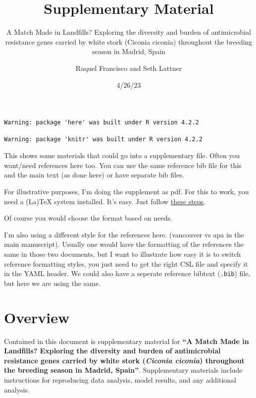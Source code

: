 \documentclass[
  letterpaper,
  DIV=11,
  numbers=noendperiod]{scrartcl}
\title{Supplementary Material}
\subtitle{A Match Made in Landfills? Exploring the diversity and burden
of antimicrobial resistance genes carried by white stork (Ciconia
ciconia) throughout the breeding season in Madrid, Spain}
\author{Raquel Francisco and Seth Lattner}
\date{4/26/23}
\begin{document}
\maketitle
\ifdefined\Shaded\renewenvironment{Shaded}{\begin{tcolorbox}[frame hidden, interior hidden, borderline west={3pt}{0pt}{shadecolor}, enhanced, sharp corners, boxrule=0pt, breakable]}{\end{tcolorbox}}\fi

\begin{verbatim}
Warning: package 'here' was built under R version 4.2.2
\end{verbatim}

\begin{verbatim}
Warning: package 'knitr' was built under R version 4.2.2
\end{verbatim}

This shows some materials that could go into a supplementary file. Often
you want/need references here too. You can use the same reference bib
file for this and the main text (as done here) or have separate bib
files.

For illustrative purposes, I'm doing the supplement as pdf. For this to
work, you need a (La)TeX system installed. It's easy. Just follow
\href{https://quarto.org/docs/output-formats/pdf-basics.html}{these
steps}.

Of course you would choose the format based on needs.

I'm also using a different style for the references here. (vancouver vs
apa in the main manuscript). Usually one would have the formatting of
the references the same in those two documents, but I want to illustrate
how easy it is to switch reference formatting styles, you just need to
get the right CSL file and specify it in the YAML header. We could also
have a seperate reference bibtext (\texttt{.bib}) file, but here we are
using the same.

\hypertarget{overview}{%
\section{Overview}\label{overview}}

Contained in this document is supplementary material for \textbf{``A
Match Made in Landfills? Exploring the diversity and burden of
antimicrobial resistance genes carried by white stork (\emph{Ciconia
ciconia}) throughout the breeding season in Madrid, Spain''}.
Supplementary materials include instructions for reproducing data
analysis, model results, and any additional analysis.
\end{document}
